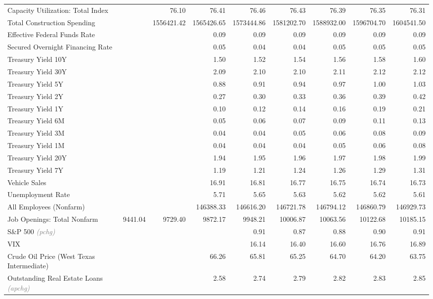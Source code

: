 \documentclass[11pt, letterpaper]{article}\usepackage[]{graphicx}\usepackage[]{color}
\begin{document}
\begin{table}[H]
\begin{tabular}{lrrrrrrrr}
  Capacity Utilization: Total Index &  & 76.10 & 76.41 & 76.46 & 76.43 & 76.39 & 76.35 & 76.31 \\ 
  Total Construction Spending &  & 1556421.42 & 1565426.65 & 1573444.86 & 1581202.70 & 1588932.00 & 1596704.70 & 1604541.50 \\ 
  Effective Federal Funds Rate &  &  & 0.09 & 0.09 & 0.09 & 0.09 & 0.09 & 0.09 \\ 
  Secured Overnight Financing Rate &  &  & 0.05 & 0.04 & 0.04 & 0.05 & 0.05 & 0.05 \\ 
  Treasury Yield 10Y &  &  & 1.50 & 1.52 & 1.54 & 1.56 & 1.58 & 1.60 \\ 
  Treasury Yield 30Y &  &  & 2.09 & 2.10 & 2.10 & 2.11 & 2.12 & 2.12 \\ 
  Treasury Yield 5Y &  &  & 0.88 & 0.91 & 0.94 & 0.97 & 1.00 & 1.03 \\ 
  Treasury Yield 2Y &  &  & 0.27 & 0.30 & 0.33 & 0.36 & 0.39 & 0.42 \\ 
  Treasury Yield 1Y &  &  & 0.10 & 0.12 & 0.14 & 0.16 & 0.19 & 0.21 \\ 
  Treasury Yield 6M &  &  & 0.05 & 0.06 & 0.07 & 0.09 & 0.11 & 0.13 \\ 
  Treasury Yield 3M &  &  & 0.04 & 0.04 & 0.05 & 0.06 & 0.08 & 0.09 \\ 
  Treasury Yield 1M &  &  & 0.04 & 0.04 & 0.04 & 0.05 & 0.06 & 0.08 \\ 
  Treasury Yield 20Y &  &  & 1.94 & 1.95 & 1.96 & 1.97 & 1.98 & 1.99 \\ 
  Treasury Yield 7Y &  &  & 1.19 & 1.21 & 1.24 & 1.26 & 1.29 & 1.31 \\ 
  Vehicle Sales &  &  & 16.91 & 16.81 & 16.77 & 16.75 & 16.74 & 16.73 \\ 
  Unemployment Rate &  &  & 5.71 & 5.65 & 5.63 & 5.62 & 5.62 & 5.61 \\ 
  All Employees (Nonfarm) &  &  & 146388.33 & 146616.20 & 146721.78 & 146794.12 & 146860.79 & 146929.73 \\ 
  Job Openings: Total Nonfarm & 9441.04 & 9729.40 & 9872.17 & 9948.21 & 10006.87 & 10063.56 & 10122.68 & 10185.15 \\ 
  S\&P 500 \textit{\footnotesize\textcolor{gray}{(pchg)}} &  &  &  & 0.91 & 0.87 & 0.88 & 0.90 & 0.91 \\ 
  VIX &  &  &  & 16.14 & 16.40 & 16.60 & 16.76 & 16.89 \\ 
  Crude Oil Price (West Texas Intermediate) &  &  & 66.26 & 65.81 & 65.25 & 64.70 & 64.20 & 63.75 \\ 
  Outstanding Real Estate Loans \textit{\footnotesize\textcolor{gray}{(apchg)}} &  &  & 2.58 & 2.74 & 2.79 & 2.82 & 2.83 & 2.85 \\ 

\end{tabular}
\end{table}
\end{document}
